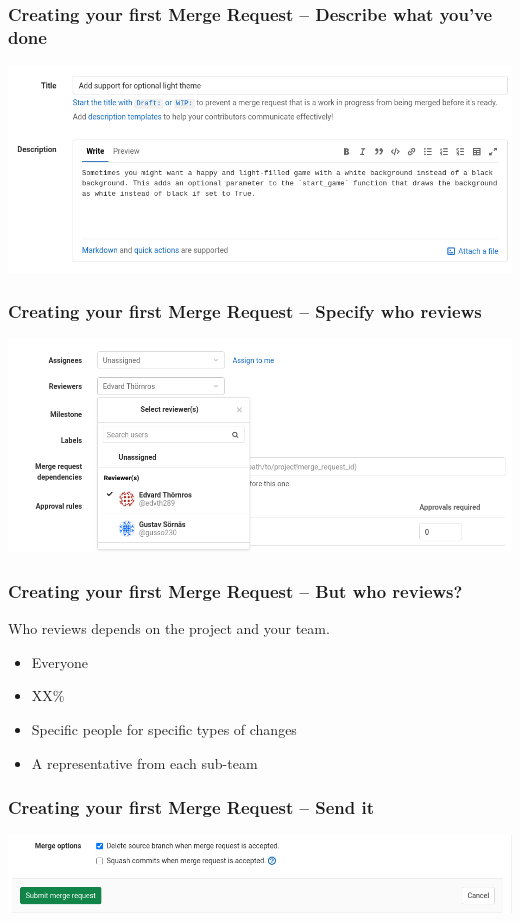 \documentclass{beamer}
\begin{document}
\begin{frame}[fragile]
  \frametitle{Creating your first Merge Request -- Describe what you've done}
  \includegraphics[width=\linewidth]{merge-request/mr-create-01-text.png}
\end{frame}

\begin{frame}[fragile]
  \frametitle{Creating your first Merge Request -- Specify who reviews}
  \includegraphics[width=\linewidth]{merge-request/mr-create-03.png} %
\end{frame}

\begin{frame}
  \frametitle{Creating your first Merge Request -- But who reviews?}
  Who reviews depends on the project and your team.

  \begin{itemize}
    \item Everyone
    \item XX\%
    \item Specific people for specific types of changes
    \item A representative from each sub-team
  \end{itemize}
\end{frame}

\begin{frame}[fragile]
  \frametitle{Creating your first Merge Request -- Send it}
  \includegraphics[width=\linewidth]{merge-request/mr-create-04.png} %
\end{frame}
\end{document}
